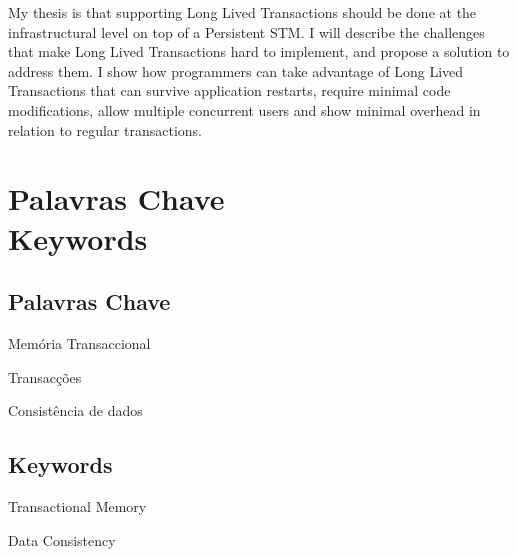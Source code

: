 My thesis is that supporting Long Lived Transactions should be done at
the infrastructural level on top of a Persistent STM.  I will describe
the challenges that make Long Lived Transactions hard to implement,
and propose a solution to address them. I show how programmers can
take advantage of Long Lived Transactions that can survive application
restarts, require minimal code modifications, allow multiple
concurrent users and show minimal overhead in relation to regular
transactions.


\newpage
\thispagestyle{empty}


\chapter*{Palavras Chave \\ Keywords}
\thispagestyle{empty}

\section*{Palavras Chave}
{\large

\noindent Memória Transaccional

\noindent Transacções

\noindent Consistência de dados

}

\section*{Keywords}

{\large

\noindent Transactional Memory

\noindent Data Consistency

}

\newpage
\thispagestyle{empty}

\cleardoublepage



\tableofcontents
\newpage

\listoffigures
\newpage



